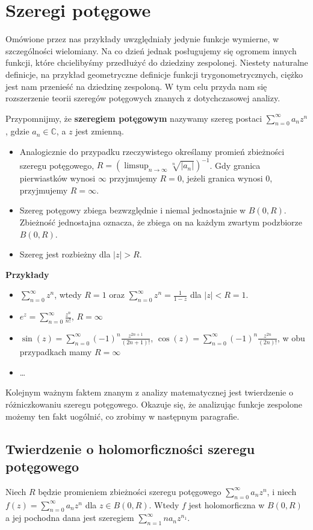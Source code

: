 \section{Szeregi potęgowe}
Omówione przez nas przykłady uwzględniały jedynie funkcje wymierne, w szczególności wielomiany. Na co dzień jednak posługujemy się ogromem innych funkcji, które chcielibyśmy przedłużyć do dziedziny zespolonej. Niestety naturalne definicje, na przykład geometryczne definicje funkcji trygonometrycznych, ciężko jest nam przenieść na dziedzinę zespoloną. W tym celu przyda nam się rozszerzenie teorii szeregów potęgowych znanych z dotychczasowej analizy. 

Przypomnijmy, że \textbf{szeregiem potęgowym} nazywamy szereg postaci $\sum_{n=0}^{\infty} a_n z^n$, gdzie $a_n \in \mathbb{C}$, a $z$ jest zmienną.
\begin{itemize}
	\item Analogicznie do przypadku rzeczywistego określamy promień zbieżności szeregu potęgowego, $R = (\limsup_{n\to\infty} \sqrt[n]{|a_n|})^{-1}$. Gdy granica pierwiastków wynosi $\infty$ przyjmujemy $R=0$, jeżeli granica wynosi $0$, przyjmujemy $R = \infty$.
	\item Szereg potęgowy zbiega bezwzględnie i niemal jednostajnie w $B(0,R)$. Zbieżność jednostajna oznacza, że zbiega on na każdym zwartym podzbiorze $B(0,R)$.
	\item Szereg jest rozbieżny dla $|z|>R$.
\end{itemize}

\textbf{Przykłady}
\begin{itemize}
	\item $\sum_{n=0}^{\infty} z^n$, wtedy $R=1$ oraz $\sum_{n=0}^{\infty} z^n = \frac{1}{1-z}$ dla $|z|<R=1$.
	\item $e^z = \sum_{n=0}^{\infty} \frac{z^n}{n!}$, $R=\infty$
	\item $\sin(z) = \sum_{n=0}^{\infty} (-1)^n \frac{z^{2n+1}}{(2n+1)!}$, $\cos(z) = \sum_{n=0}^{\infty} (-1)^n \frac{z^{2n}}{(2n)!}$, w obu przypadkach mamy $R = \infty$
	\item \dots
\end{itemize}

 Kolejnym ważnym faktem znanym z analizy matematycznej jest twierdzenie o różniczkowaniu szeregu potęgowego. Okazuje się, że analizując funkcje zespolone możemy ten fakt uogólnić, co zrobimy w następnym paragrafie.

\subsection{Twierdzenie o holomorficzności szeregu potęgowego}
Niech $R$ będzie promieniem zbieżności szeregu potęgowego $\sum_{n=0}^{\infty} a_n z^n$, i niech $f(z) = \sum_{n=0}^{\infty} a_nz^n$ dla $z \in B(0,R)$. Wtedy $f$ jest holomorficzna w $B(0,R)$ a jej pochodna dana jest szeregiem $\sum_{n=1}^{\infty} na_n z^{n_1}$.

